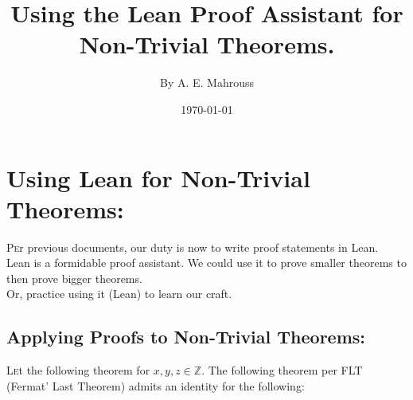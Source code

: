 \documentclass[10pt]{article}
\title{%
	\vspace{-1.5em}%
	\large\textbf{Using the Lean Proof Assistant for Non-Trivial Theorems.}%
}
\author{By A. E. Mahrouss}
\date{\today}
\theoremstyle{plain}
\theoremstyle{definition}
\theoremstyle{remark}
\begin{document}
	
	\maketitle
	\tableofcontents
	\newpage
	
	\section{Using Lean for Non-Trivial Theorems:}
	
	\lettrine[lines=2, lhang=0.1, loversize=0.2]{P}er previous documents, our duty is now to write proof statements in Lean.\\
	Lean is a formidable proof assistant. We could use it to prove smaller theorems to then prove bigger theorems.\\Or, practice using it (Lean) to learn our craft.

	\subsection{Applying Proofs to Non-Trivial Theorems:}

	\lettrine[lines=1, lhang=0.1, loversize=0.2]{L}et the following theorem for $x, y, z \in \mathbb{Z}$. The following theorem per FLT (Fermat' Last Theorem) admits an identity for the following:
	
\end{document}
